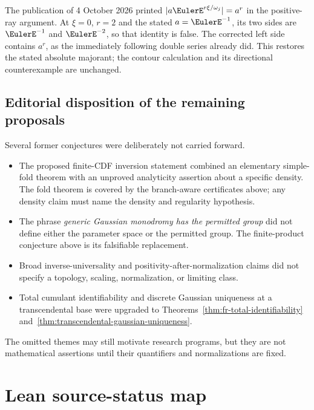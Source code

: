 \begin{remark}
\label{rem:cyclotomic-majorant-factor}
The publication of 4 October 2026 printed
\(\lvert a\EulerE^{r\xi/\omega_j}\rvert=a^r\) in the positive-ray argument.
At \(\xi=0\), \(r=2\) and the stated \(a=\EulerE^{-1}\), its two sides
are \(\EulerE^{-1}\) and \(\EulerE^{-2}\), so that identity is false.
The corrected left side contains \(a^r\), as the immediately following
double series already did. This restores the stated absolute majorant;
the contour calculation and its directional counterexample are unchanged.
\end{remark}

\subsection{Editorial disposition of the remaining proposals}

Several former conjectures were deliberately not carried forward.

\begin{itemize}
\item The proposed finite-CDF inversion statement combined an elementary
  simple-fold theorem with an unproved analyticity assertion about a specific
  density.  The fold theorem is covered by the branch-aware certificates
  above; any density claim must name the density and regularity hypothesis.
\item The phrase \emph{generic Gaussian monodromy has the permitted group}
  did not define either the parameter space or the permitted group.  The
  finite-product conjecture above is its falsifiable replacement.
\item Broad inverse-universality and positivity-after-normalization claims did
  not specify a topology, scaling, normalization, or limiting class.
\item Total cumulant identifiability and discrete Gaussian uniqueness at a
  transcendental base were upgraded to
  Theorems~\ref{thm:fr-total-identifiability}
  and~\ref{thm:transcendental-gaussian-uniqueness}.
\end{itemize}

The omitted themes may still motivate research programs, but they are not
mathematical assertions until their quantifiers and normalizations are fixed.

\section{Lean source-status map}
\label{sec:lean-certification-map}


